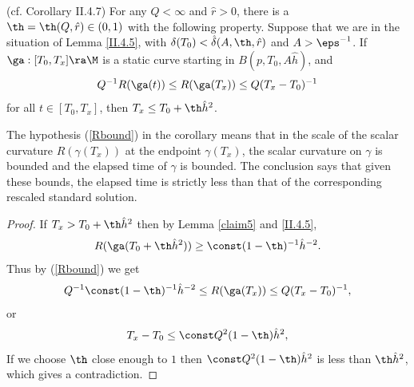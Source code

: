 \begin{corollary}
  \label{cor:kl-technical-estimate-existence-technical-estimate}
(cf. Corollary II.4.7)
For any $Q<\infty$ and $\hat r>0$, there is a $\th=\th(Q,\hat r)\in (0,1)$
with the following property.  Suppose that we are in the situation of
Lemma \ref{II.4.5}, with
$\delta(T_0) < \hat{\delta}(A, \th, \hat r)$
and $A>\eps^{-1}$.  If $\ga:[T_0,T_x]\ra \M$ is a static curve
starting in $B(p,T_0,A\hat h)$, and
\begin{equation}
\label{Rbound}
Q^{-1}R(\ga(t))\leq R(\ga(T_x))\leq Q(T_x-T_0)^{-1}
\end{equation}
for all $t\in [T_0,T_x]$,  then $T_x\leq T_0+\th\hat h^2$.
\end{corollary}
\begin{remark}
  \label{rem:kl-technical-estimate-estimates-standard-solutions}

The hypothesis (\ref{Rbound}) in the corollary means
that in the scale of the scalar curvature $R(\gamma(T_x))$ at the
endpoint $\gamma(T_x)$, the scalar curvature on $\gamma$ is bounded
and the elapsed time of $\gamma$ is bounded. The conclusion says that
given these bounds, the elapsed time is strictly less than that of
the corresponding rescaled standard solution.
\end{remark}
\begin{proof}
If $T_x>T_0+\th\hat h^2$ then by Lemma \ref{claim5} and \ref{II.4.5},
\begin{equation}
R(\ga(T_0+\th\hat h^2))\ge \const(1-\th)^{-1}\hat h^{-2}.
\end{equation}
Thus by (\ref{Rbound}) we get
\begin{equation}
Q^{-1}\const (1-\th)^{-1}\hat h^{-2}\leq R(\ga(T_x))\leq Q(T_x-T_0)^{-1},
\end{equation}
or
\begin{equation}
T_x-T_0\leq \const Q^2(1-\th)\hat h^2,
\end{equation}
If we choose $\th$ close enough to $1$ then $\const Q^2(1-\th)\hat h^2$ is less than
$\th\hat h^2$, which gives a contradiction.
\end{proof}


